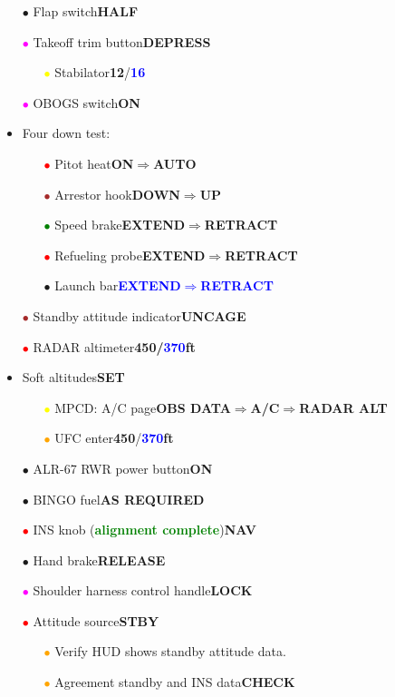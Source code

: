 \documentclass[a4paper,12pt,dvipsnames]{letter}
\newcommand{\button}[1]{\textbf{#1}}
\newcommand{\ok}[1]{\textcolor{Green}{\textbf{#1}}}
\newcommand{\boat}[1]{\textcolor{Blue}{\textbf{#1}}}
\newcommand{\bi}{\textcolor{ProcessBlue}{$\bullet$\;}}
\newcommand{\ri}{\textcolor{Red}{$\bullet$\;}}
\newcommand{\gi}{\textcolor{Green}{$\bullet$\;}}
\newcommand{\yi}{\textcolor{Yellow}{$\bullet$\;}}
\newcommand{\mi}{\textcolor{Magenta}{$\bullet$\;}}
\newcommand{\oi}{\textcolor{Orange}{$\bullet$\;}}
\newcommand{\ai}{\textcolor{Apricot}{$\bullet$\;}}
\renewcommand{\ni}{\textcolor{Brown}{$\bullet$\;}}
\begin{document}
{\begin{itemize}
 \item[\bi] Flap switch\dotfill\button{HALF}
 \item[\mi] Takeoff trim button\dotfill\button{DEPRESS}
 \begin{itemize}
  \item[\yi] Stabilator\dotfill\button{12\textdegree}/\boat{16\textdegree}
 \end{itemize}
 \item[\mi] OBOGS switch\dotfill\button{ON}
 \item Four down test:
 \begin{itemize}
  \item[\ri] Pitot heat\dotfill\button{ON\;$\Rightarrow$\;AUTO}
  \item[\ni] Arrestor hook\dotfill\button{DOWN\;$\Rightarrow$\;UP}
  \item[\gi] Speed brake\dotfill\button{EXTEND\;$\Rightarrow$\;RETRACT}
  \item[\ri] Refueling probe\dotfill\button{EXTEND\;$\Rightarrow$\;RETRACT}
  \item[\bi] Launch bar\dotfill\boat{EXTEND\;$\Rightarrow$\;RETRACT}
 \end{itemize}
 \item[\ni] Standby attitude indicator\dotfill\button{UNCAGE}
 \item[\ri] RADAR altimeter\dotfill\button{450/\boat{370}\;ft}
 \item Soft altitudes\dotfill\button{SET}
 \begin{itemize}
  \item[\yi] MPCD: A/C page\dotfill\button{OBS DATA\;$\Rightarrow$\;A/C\;$\Rightarrow$\;RADAR ALT}
  \item[\oi] UFC enter\dotfill\button{450}/\boat{370}\button{\;ft}
 \end{itemize}
 \item[\ai] ALR-67 RWR power button\dotfill\button{ON}
 \item[\bi] BINGO fuel\dotfill\button{AS REQUIRED}
 \item[\ri] INS knob (\ok{alignment complete})\dotfill\button{NAV}
 \item[\bi] Hand brake\dotfill\button{RELEASE}
 \item[\mi] Shoulder harness control handle\dotfill\button{LOCK}
 \item[\ri] Attitude source\dotfill\button{STBY}
 \begin{itemize}
  \item[\oi] Verify HUD shows standby attitude data.
  \item[\oi] Agreement standby and INS data\dotfill\button{CHECK}

\end{itemize}
\end{itemize}}
\end{document}
